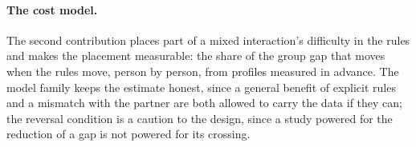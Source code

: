 
\paragraph{The cost model.} The second contribution places part of a mixed interaction's difficulty in the rules and makes the placement measurable: the share of the group gap that moves when the rules move, person by person, from profiles measured in advance. The model family keeps the estimate honest, since a general benefit of explicit rules and a mismatch with the partner are both allowed to carry the data if they can; the reversal condition is a caution to the design, since a study powered for the reduction of a gap is not powered for its crossing.

